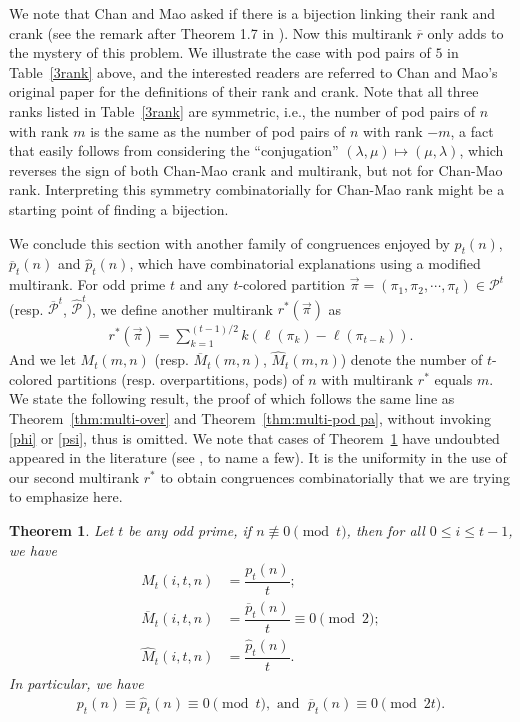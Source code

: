 \documentclass[12pt]{amsart}
\numberwithin{equation}{section}
\theoremstyle{plain}
\newtheorem{theorem}{Theorem}[section]
\theoremstyle{definition}
\begin{document}
We note that Chan and Mao asked if there is a bijection linking their rank and crank (see the remark after Theorem 1.7 in \cite{CM}). Now this multirank $\overline{r}$ only adds to the mystery of this problem. We illustrate the case with pod pairs of $5$ in Table~\ref{3rank} above, and the interested readers are referred to Chan and Mao's original paper \cite{CM} for the definitions of their rank and crank. Note that all three ranks listed in Table~\ref{3rank} are symmetric, i.e., the number of pod pairs of $n$ with rank $m$ is the same as the number of pod pairs of $n$ with rank $-m$, a fact that easily follows from considering the ``conjugation'' $(\lambda,\mu)\mapsto (\mu,\lambda)$, which reverses the sign of both Chan-Mao crank and multirank, but not for Chan-Mao rank. Interpreting this symmetry combinatorially for Chan-Mao rank might be a starting point of finding a bijection.

We conclude this section with another family of congruences enjoyed by $p_t(n)$, $\overline{p}_t(n)$ and $\hat{p}_t(n)$, which have combinatorial explanations using a modified multirank. For odd prime $t$ and any $t$-colored partition $\overrightarrow{\pi}=(\pi_1,\pi_2,\cdots,\pi_t)\in\mathcal{P}^t$ (resp. $\overline{\mathcal{P}}^t$, $\hat{\mathcal{P}}^t$), we define another multirank $r^{*}(\overrightarrow{\pi})$ as
\begin{align*}
r^{*}(\overrightarrow{\pi})=\sum_{k=1}^{(t-1)/2}k(\ell(\pi_{k})-\ell(\pi_{t-k})).
\end{align*}
And we let $M_t(m,n)$ (resp. $\overline{M}_t(m,n)$, $\hat{M}_t(m,n)$) denote the number of $t$-colored partitions (resp. overpartitions, pods) of $n$ with multirank $r^{*}$ equals $m$. We state the following result, the proof of which follows the same line as Theorem~\ref{thm:multi-over} and Theorem~\ref{thm:multi-pod pa}, without invoking \eqref{phi} or \eqref{psi}, thus is omitted. We note that cases of Theorem~\ref{thm:newmulti} have undoubted appeared in the literature (see \cite{Chen,For,Hir1,New}, to name a few). It is the uniformity in the use of our second multirank $r^*$ to obtain congruences combinatorially that we are trying to emphasize here.
\begin{theorem}\label{thm:newmulti}
Let $t$ be any odd prime, if $n\not \equiv 0 \pmod t$, then for all $0\leq i\leq t-1$, we have
\begin{align*}
M_{t}(i,t,n)&=\dfrac{p_{t}(n)}{t};\\
\overline{M}_{t}(i,t,n)&=\dfrac{\overline{p}_{t}(n)}{t}\equiv 0 \pmod 2;\\
\hat{M}_{t}(i,t,n)&=\dfrac{\hat{p}_{t}(n)}{t}.
\end{align*}
In particular, we have
\begin{align*}
p_t(n)\equiv \hat{p}_t(n)\equiv 0 \pmod t, \text{ and }\; \overline{p}_t(n)\equiv 0 \pmod {2t}.
\end{align*}
\end{theorem}
\end{document}
